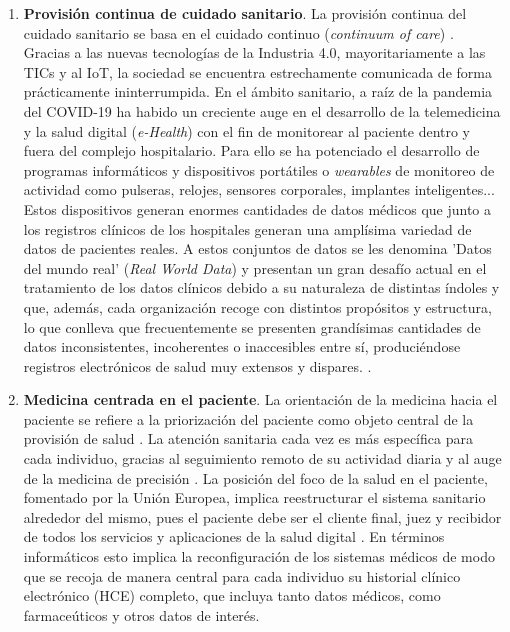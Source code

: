 \begin{enumerate}

\item \textbf{Provisión continua de cuidado sanitario}. La provisión continua del cuidado sanitario se basa en el cuidado continuo (\textit{continuum of care}) \cite{kouroubali2019new}. Gracias a las nuevas tecnologías de la Industria 4.0, mayoritariamente a las TICs y al IoT, la sociedad se encuentra estrechamente comunicada de forma prácticamente ininterrumpida. En el ámbito sanitario, a raíz de la pandemia del COVID-19 ha habido un creciente auge en el desarrollo de la telemedicina y la salud digital (\textit{e-Health}) \cite{martin2021ehealth} con el fin de monitorear al paciente dentro y fuera del complejo hospitalario. Para ello se ha potenciado el desarrollo de programas informáticos y dispositivos portátiles o \textit{wearables} de monitoreo de actividad como pulseras, relojes, sensores corporales, implantes inteligentes... Estos dispositivos generan enormes cantidades de datos médicos que junto a los registros clínicos de los hospitales generan una amplísima variedad de datos de pacientes reales. A estos conjuntos de datos se les denomina 'Datos del mundo real' (\textit{Real World Data}) y presentan un gran desafío actual en el tratamiento de los datos clínicos debido a su naturaleza de distintas índoles y que, además, cada organización recoge con distintos propósitos y estructura, lo que conlleva que frecuentemente se presenten grandísimas cantidades de datos inconsistentes, incoherentes o inaccesibles entre sí, produciéndose registros electrónicos de salud muy extensos y dispares. \cite{kouroubali2019new}.

\item \textbf{Medicina centrada en el paciente}. La orientación de la medicina hacia el paciente se refiere a la priorización del paciente como objeto central de la provisión de salud  \cite{tortorella2020healthcare}. La atención sanitaria cada vez es más específica para cada individuo, gracias al seguimiento remoto de su actividad diaria y al auge de la medicina de precisión \cite{ruiz2023inteligencia}. La posición del foco de la salud en el paciente, fomentado por la Unión Europea,  implica reestructurar el sistema sanitario alrededor del mismo, pues el paciente debe ser el cliente final, juez y recibidor de todos los servicios y aplicaciones de la salud digital \cite{ntafi2022legal} \cite{katehakis2019framework}. En términos informáticos esto implica la reconfiguración de los sistemas médicos de modo que se recoja de manera central para cada individuo su historial clínico electrónico (HCE) completo, que incluya tanto datos médicos, como farmaceúticos y otros datos de interés.  


\end{enumerate}
